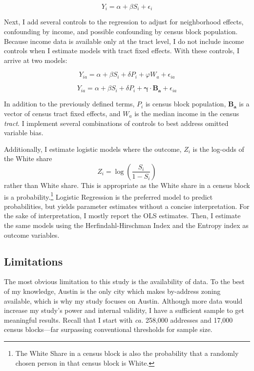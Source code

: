 \documentclass[11pt]{article}
\begin{document}
\begin{equation} \label{eqn:biv_regression}
Y_i=\alpha+\beta S_i+\epsilon_i
\end{equation}

Next, I add several controls to the regression to adjust for neighborhood effects, confounding by income, and possible confounding by census block population. Because income data is available only at the tract level, I do not include income controls when I estimate models with tract fixed effects. With these controls, I arrive at two models:

\begin{equation} \label{eqn:full_model_income}
    Y_{ia}=\alpha+\beta S_i+\delta P_i+\varphi W_a +\epsilon_{ia}
\end{equation}

\begin{equation} \label{eqn:full_model_FEs}
    Y_{ia}=\alpha+\beta S_i+\delta P_i+\boldsymbol{\gamma}\cdot\boldsymbol{B_a} +\epsilon_{ia}
\end{equation}



In addition to the previously defined terms, $P_i$ is census block population, $\boldsymbol{B_a}$ is a vector of census tract fixed effects, and $W_a$ is the median income in the census \textit{tract}. I implement several combinations of controls to best address omitted variable bias.

Additionally, I estimate logistic models where the outcome, $Z_i$ is the log-odds of the White share
\begin{equation} \label{eqn:logit_defn}
    Z_i=\log\left(\frac{S_i}{1-S_i}\right)
\end{equation}
rather than White share. This is appropriate as the White share in a census block is a probability.\footnote{The White Share in a census block is also the probability that a randomly chosen person in that census block is White.} Logistic Regression is the preferred model to predict probabilities, but yields parameter estimates without a concise interpretation. For the sake of interpretation, I mostly report the OLS estimates. Then, I estimate the same models using the Herfindahl-Hirschman Index and the Entropy index as outcome variables.

\subsection{Limitations}

The most obvious limitation to this study is the availability of data. To the best of my knowledge, Austin is the only city which makes by-address zoning available, which is why my study focuses on Austin. Although more data would increase my study's power and internal validity, I have a sufficient sample to get meaningful results. Recall that I start with \textit{ca.} 258,000 addresses and 17,000 census blocks---far surpassing conventional thresholds for sample size.
\end{document}
